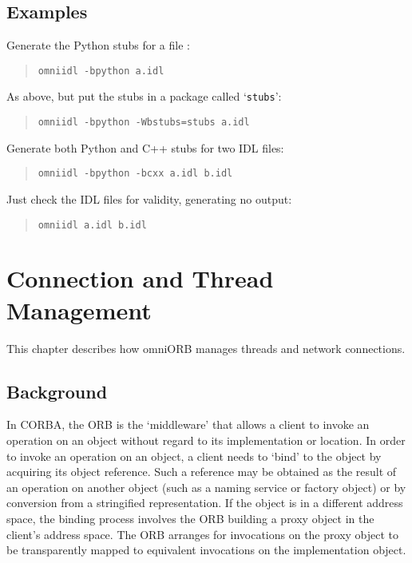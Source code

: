 \documentclass[11pt,oneside,a4paper]{book}
\newcommand{\module}[1]{\texttt{#1}}
\newcommand{\cmdline}[1]{\texttt{#1}}
\begin{document}
\section{Examples}

Generate the Python stubs for a file :

\begin{quote}
\cmdline{omniidl -bpython a.idl}
\end{quote}

\noindent As above, but put the stubs in a package called
`\module{stubs}':

\begin{quote}
\cmdline{omniidl -bpython -Wbstubs=stubs a.idl}
\end{quote}

\noindent Generate both Python and C++ stubs for two IDL files:

\begin{quote}
\cmdline{omniidl -bpython -bcxx a.idl b.idl}
\end{quote}

\noindent Just check the IDL files for validity, generating no output:

\begin{quote}
\cmdline{omniidl a.idl b.idl}
\end{quote}



\chapter{Connection and Thread Management}
\label{chap:connections}


This chapter describes how omniORB manages threads and network
connections.

\section{Background}

In CORBA, the ORB is the `middleware' that allows a client to invoke
an operation on an object without regard to its implementation or
location. In order to invoke an operation on an object, a client needs
to `bind' to the object by acquiring its object reference. Such a
reference may be obtained as the result of an operation on another
object (such as a naming service or factory object) or by conversion
from a stringified representation. If the object is in a different
address space, the binding process involves the ORB building a proxy
object in the client's address space. The ORB arranges for invocations
on the proxy object to be transparently mapped to equivalent
invocations on the implementation object.
\end{document}
